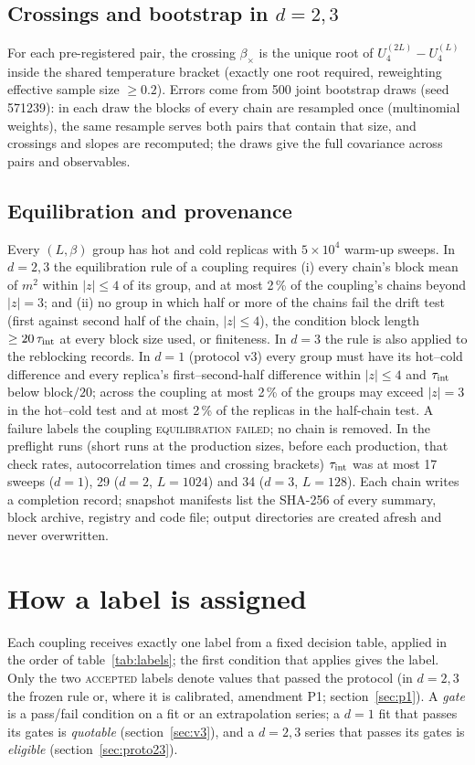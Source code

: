 \documentclass[10pt,a4paper]{article}
\newcommand{\lbl}[1]{{\mdseries\scshape #1}}
\begin{document}
\subsection{\texorpdfstring{Crossings and bootstrap in $d=2,3$}{Crossings and bootstrap in d=2,3}}
For each pre-registered pair, the crossing $\beta_\times$ is the unique root of $U_4^{(2L)}-U_4^{(L)}$ inside the shared temperature bracket
(exactly one root required, reweighting effective sample size $\ge0.2$). Errors come from 500 joint bootstrap draws (seed 571239): in each draw the blocks of every chain are resampled once (multinomial
weights), the same resample serves both pairs that contain that size, and crossings and slopes are recomputed; the draws give the full covariance across pairs and
observables.

\subsection{Equilibration and provenance}
Every $(L,\beta)$ group has hot and cold replicas with $5\times10^4$ warm-up sweeps. In $d=2,3$ the equilibration rule of a coupling requires
(i) every chain's block mean of $m^2$ within $|z|\le4$ of its group, and at most 2\,\% of the coupling's chains beyond $|z|=3$; and (ii) no
group in which half or more of the chains fail the drift test (first against second half of the chain, $|z|\le4$), the condition block
length $\ge20\,\tau_{\rm int}$ at every block size used, or finiteness. In $d=3$ the rule is also applied to the reblocking records. In $d=1$
(protocol v3) every group must have its hot--cold difference and every replica's first--second-half difference within $|z|\le4$ and
$\tau_{\rm int}$ below block$/20$; across the coupling at most 2\,\% of the groups may exceed $|z|=3$ in the hot--cold test and at most 2\,\% of
the replicas in the half-chain test. A failure labels the coupling \lbl{equilibration failed}; no chain is removed. In the preflight runs
(short runs at the production sizes, before each production, that check rates, autocorrelation times and crossing brackets) $\tau_{\rm int}$
was at most 17 sweeps ($d=1$), 29 ($d=2$, $L=1024$) and 34 ($d=3$, $L=128$). Each chain writes a
completion record; snapshot manifests list the SHA-256 of every summary, block archive, registry and code file; output directories are
created afresh and never overwritten.

\section{How a label is assigned}\label{sec:labels}
Each coupling receives exactly one label from a fixed decision table, applied in the order of table~\ref{tab:labels}; the first condition that
applies gives the label. Only the two \lbl{accepted} labels denote values that passed the protocol (in $d=2,3$ the frozen rule or, where it
is calibrated, amendment P1; section~\ref{sec:p1}). A \emph{gate} is a pass/fail condition on a fit or an extrapolation series; a $d=1$ fit that
passes its gates is \emph{quotable} (section~\ref{sec:v3}), and a $d=2,3$ series that passes its gates is \emph{eligible}
(section~\ref{sec:proto23}).
\end{document}
